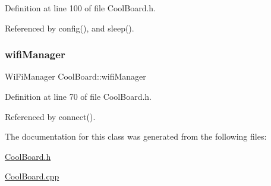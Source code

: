 Definition at line 100 of file Cool\+Board.\+h.



Referenced by config(), and sleep().

\mbox{\label{classCoolBoard_a55b28656e295140928557c47d7fff01e}} 
\subsubsection{\texorpdfstring{wifi\+Manager}{wifiManager}}
{\footnotesize\ttfamily Wi\+Fi\+Manager Cool\+Board\+::wifi\+Manager\hspace{0.3cm}{\ttfamily [private]}}



Definition at line 70 of file Cool\+Board.\+h.



Referenced by connect().



The documentation for this class was generated from the following files\+:\begin{DoxyCompactItemize}
\item 
\hyperlink{CoolBoard_8h}{Cool\+Board.\+h}\item 
\hyperlink{CoolBoard_8cpp}{Cool\+Board.\+cpp}\end{DoxyCompactItemize}
